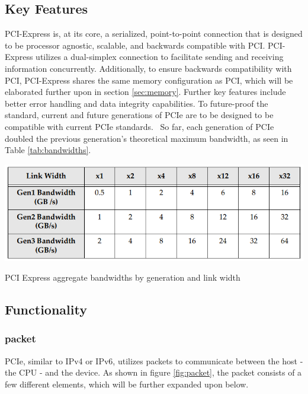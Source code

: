 \subsection{Key Features}

PCI-Express is, at its core, a serialized, point-to-point connection that is designed to be processor agnostic, scalable, and backwards compatible with PCI.\cite{lawley_understanding_2014, pci-sig_pci_2011, pci-sig_membership_nodate} PCI-Express utilizes a dual-simplex connection to facilitate sending and receiving information concurrently. Additionally, to ensure backwards compatibility with PCI, PCI-Express shares the same memory configuration as PCI, which will be elaborated further upon in section \ref{sec:memory}. Further key features include better error handling and data integrity capabilities. \parencite{verma_pcie_2017} To future-proof the standard, current and future generations of PCIe are to be designed to be compatible with current PCIe standards.~\parencite{pci-sig_membership_nodate} So far, each generation of PCIe doubled the previous generation's theoretical maximum bandwidth, as seen in Table \ref{tab:bandwidths}.

\begin{table}
\includegraphics[width = \linewidth]{figures/PCIE-bandwidths}
\caption{PCI Express aggregate bandwidths by generation and link width ~\parencite{jackson_pci_2012}}
\label{tab:bandwidths}
\end{table}

\subsection{Functionality}

\subsubsection{packet}
PCIe, similar to IPv4 or IPv6, utilizes packets to communicate between the host - the CPU - and the device. As shown in figure \ref{fig:packet}, the packet consists of a few different elements, which will be further expanded upon below. 

